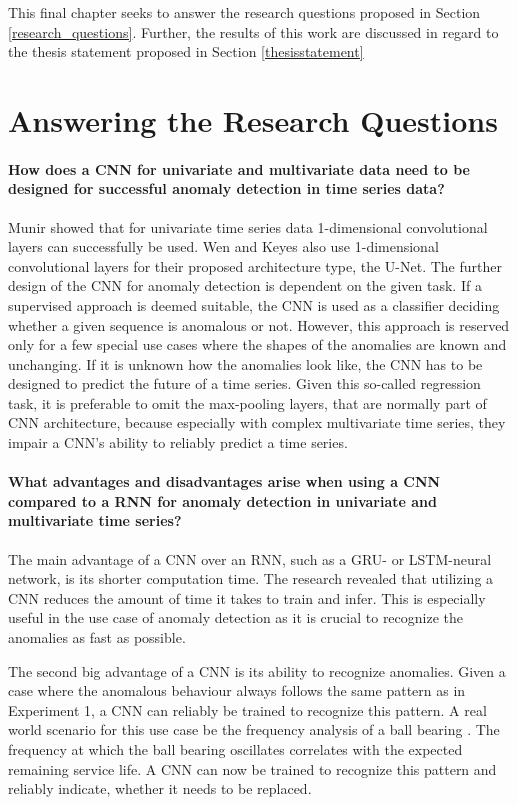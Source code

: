 This final chapter seeks to answer the research questions proposed in Section \ref{research_questions}. Further, the results of this work are discussed in regard to the thesis statement proposed in Section \ref{thesisstatement}

\section{Answering the Research Questions}


\paragraph{How does a CNN for univariate and multivariate data need to be designed for successful anomaly detection in time series data?}

Munir \parencite*{Munir2019} showed that for univariate time series data 1-dimensional convolutional layers can successfully be used. Wen and Keyes \parencite*{Wen2019} also use 1-dimensional convolutional layers for their proposed architecture type, the U-Net. The further design of the CNN for anomaly detection is dependent on the given task. If a supervised approach is deemed suitable, the CNN is used as a classifier deciding whether a given sequence is anomalous or not. However, this approach is reserved only for a few special use cases where the shapes of the anomalies are known and unchanging. If it is unknown how the anomalies look like, the CNN has to be designed to predict the future of a time series. Given this so-called regression task, it is preferable to omit the max-pooling layers, that are normally part of CNN architecture, because especially with complex multivariate time series, they impair a CNN's ability to reliably predict a time series.  

\paragraph{What advantages and disadvantages arise when using a CNN compared to a RNN for anomaly detection in univariate and multivariate time series?} The main advantage of a CNN over an RNN, such as a GRU- or LSTM-neural network, is its shorter computation time. The research revealed that utilizing a CNN reduces the amount of time it takes to train and infer. This is especially useful in the use case of anomaly detection as it is crucial to recognize the anomalies as fast as possible.

The second big advantage of a CNN is its ability to recognize anomalies. Given a case where the anomalous behaviour always follows the same pattern as in Experiment 1, a CNN can reliably be trained to recognize this pattern. A real world scenario for this use case be the frequency analysis of a ball bearing \parencite{Mais2002}. The frequency at which the ball bearing oscillates correlates with the expected remaining service life. A CNN can now be trained to recognize this pattern and reliably indicate, whether it needs to be replaced.

